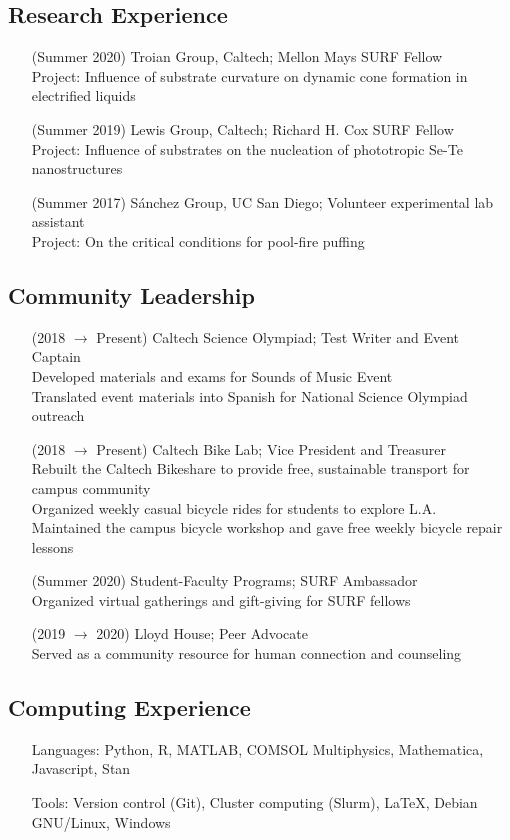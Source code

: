 \documentclass{article}
\begin{document}
\nocite{*}
\printbibliography[title={Publications}, heading=subbibliography]


\subsection*{Research Experience}

\begin{enumerate}
    \item [(Summer 2020)] Troian Group, Caltech; Mellon Mays SURF Fellow \\
        Project: Influence of substrate curvature on dynamic cone formation in electrified liquids
    \item [(Summer 2019)] Lewis Group, Caltech; Richard H. Cox SURF Fellow \\
        Project: Influence of substrates on the nucleation of phototropic Se-Te nanostructures
    \item [(Summer 2017)] Sánchez Group, UC San Diego; Volunteer experimental lab assistant \\
        Project: On the critical conditions for pool-fire puffing
\end{enumerate}


\subsection*{Community Leadership}

\begin{enumerate}
    \item [(2018 $\to$ Present)] Caltech Science Olympiad; Test Writer and Event Captain \\
        Developed materials and exams for Sounds of Music Event \\
        Translated event materials into Spanish for National Science Olympiad outreach
    \item [(2018 $\to$ Present)] Caltech Bike Lab; Vice President and Treasurer \\
        Rebuilt the Caltech Bikeshare to provide free, sustainable transport for campus community \\
        Organized weekly casual bicycle rides for students to explore L.A. \\
        Maintained the campus bicycle workshop and gave free weekly bicycle repair lessons
    \item [(Summer 2020)] Student-Faculty Programs; SURF Ambassador \\
        Organized virtual gatherings and gift-giving for SURF fellows
    \item [(2019 $\to$ 2020)] Lloyd House; Peer Advocate \\
        Served as a community resource for human connection and counseling
\end{enumerate}


\subsection*{Computing Experience}

\begin{enumerate}
    \item [Languages:] Python, R, MATLAB, COMSOL Multiphysics, Mathematica, Javascript, Stan
    \item [Tools:] Version control (Git), Cluster computing (Slurm), \LaTeX, Debian GNU/Linux, Windows
\end{enumerate}
\end{document}
